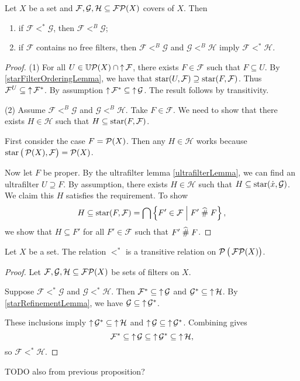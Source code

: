 \begin{proposition}
Let $X$ be a set and $\mathcal{F},\mathcal{G}, \mathcal{H}\subseteq \operatorname{\mathcal{FP}}(X)$ covers of $X$. Then
\begin{enumerate}
\item if $\mathcal{F} <^* \mathcal{G}$, then $\mathcal{F} <^B \mathcal{G}$;
\item if $\mathcal{F}$ contains no free filters, then $\mathcal{F} <^B \mathcal{G}$ and $\mathcal{G} <^B \mathcal{H}$ imply $\mathcal{F} <^* \mathcal{H}$.
\end{enumerate}
\end{proposition}
\begin{proof}
(1) For all $U\in \operatorname{\mathbb{U}\mathcal{P}}(X) \cap \operatorname{\uparrow}\mathcal{F}$, there exists $F\in \mathcal{F}$ such that $F\subseteq U$. By \ref{starFilterOrderingLemma}, we have that $\operatorname{star}(U,\mathcal{F}) \supseteq \operatorname{star}(F, \mathcal{F})$. Thus $\mathcal{F}^U \subseteq \operatorname{\uparrow}\mathcal{F}^*$. By assumption $\operatorname{\uparrow} \mathcal{F}^* \subseteq \operatorname{\uparrow}\mathcal{G}$. The result follows by transitivity.

(2) Assume $\mathcal{F} <^B \mathcal{G}$ and $\mathcal{G} <^B \mathcal{H}$. Take $F\in\mathcal{F}$. We need to show that there exists $H\in \mathcal{H}$ such that $H \subseteq \operatorname{star}(F,\mathcal{F})$.

First consider the case $F = \operatorname{\mathcal{P}}(X)$. Then any $H\in \mathcal{H}$ works because $\operatorname{star}\big(\operatorname{\mathcal{P}}(X), \mathcal{F}\big) = \operatorname{\mathcal{P}}(X)$.

Now let $F$ be proper. By the ultrafilter lemma \ref{ultrafilterLemma}, we can find an ultrafilter $U\supseteq F$. By assumption, there exists $H\in \mathcal{H}$ such that $H \subseteq \operatorname{star}(\dot{x}, \mathcal{G})$. We claim this $H$ satisfies the requirement. To show
\[ H \subseteq \operatorname{star}(F,\mathcal{F}) = \bigcap\left\{ F'\in \mathcal{F} \;\middle|\; F'\mathrel{\widehat{\#}} F \right\}, \]
we show that $H\subseteq F'$ for all $F'\in \mathcal{F}$ such that $F'\mathrel{\widehat{\#}} F$.
\end{proof}

\begin{proposition}
Let $X$ be a set. The relation $<^*$ is a transitive relation on $\operatorname{\mathcal{P}}\big(\operatorname{\mathcal{FP}}(X)\big)$.
\end{proposition}
\begin{proof}
Let $\mathcal{F}, \mathcal{G}, \mathcal{H}\subseteq \operatorname{\mathcal{FP}}(X)$ be sets of filters on $X$.

Suppose $\mathcal{F}<^* \mathcal{G}$ and $\mathcal{G} <^* \mathcal{H}$.
Then $\mathcal{F}^*\subseteq \operatorname{\uparrow} \mathcal{G}$ and $\mathcal{G}^* \subseteq \operatorname{\uparrow} \mathcal{H}$. By \ref{starRefinementLemma}, we have $\mathcal{G}\subseteq \operatorname{\uparrow} \mathcal{G}^*$.

These inclusions imply $\operatorname{\uparrow} \mathcal{G}^* \subseteq \operatorname{\uparrow} \mathcal{H}$ and $\operatorname{\uparrow} \mathcal{G} \subseteq \operatorname{\uparrow} \mathcal{G}^*$. Combining gives
\[ \mathcal{F}^* \subseteq \operatorname{\uparrow} \mathcal{G} \subseteq \operatorname{\uparrow} \mathcal{G}^* \subseteq \operatorname{\uparrow} \mathcal{H}, \]
so $\mathcal{F} <^* \mathcal{H}$.
\end{proof}
TODO also from previous proposition?

